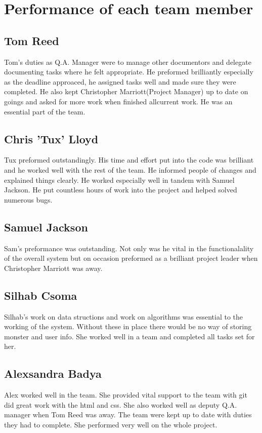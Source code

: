 \documentclass{project}
\begin{document}
\section{Performance of each team member}
\subsection{Tom Reed}
Tom's duties as Q.A. Manager were to manage other documentors and delegate documenting tasks where he felt appropriate. He preformed brilliantly especially as the deadline approaced, he assigned tasks well and made sure they were completed. He also kept Christopher Marriott(Project Manager) up to date on goings and asked for more work when finished allcurrent work. He was an essential part of the team. 

\subsection{Chris 'Tux' Lloyd}
Tux preformed outstandingly. His time and effort put into the code was brilliant and he worked well with the rest of the team. He informed people of changes and explained things clearly. He worked especially well in tandem with Samuel Jackson. He put countless hours of work into the project and helped solved numerous bugs.

\subsection{Samuel Jackson}
Sam's preformance was outstanding. Not only was he vital in the functionalality of the overall system but on occasion preformed as a brilliant project leader when Christopher Marriott was away. 

\subsection{Silhab Csoma}
Silhab's work on data structions and work on algorithms was essential to the working of the system. Without these in place there would be no way of storing monster and user info. She worked well in a team and completed all tasks set for her.

\subsection{Alexsandra Badya}
Alex worked well in the team. She provided vital support to the team with git did great work with the html and css. She also worked well as deputy Q.A. manager when Tom Reed was away. The team were kept up to date with duties they had to complete. She performed very well on the whole project.
\end{document}
